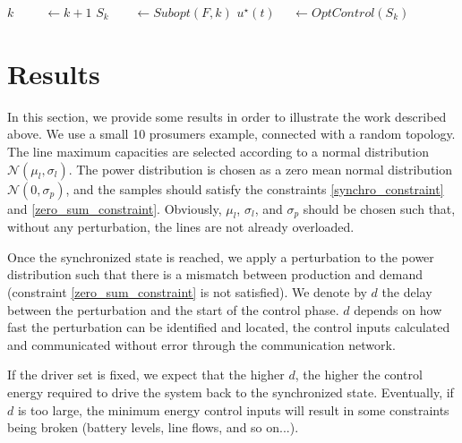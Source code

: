 \documentclass[10pt,twoside%
                ,draft%
        ]{article}
\begin{document}
\begin{algorithm}
\label{algo_1}
        \begin{algorithmic}
    \State $k\ \ \ \ \ \ \ \ \ \ \ \gets k+1$
    \State $ S_k \ \ \ \ \ \ \ \ \ \gets Subopt(F, k)$
    \State $ u^{\star}(t)\ \ \ \ \ \ \gets OptControl(S_{k})$ 

        \end{algorithmic}
\end{algorithm}
\normalsize



\section{Results}
In this section, we provide some results in order to illustrate the work described above. We use a small 10 prosumers example, connected with a random topology. The line maximum capacities are selected  according to a normal distribution $\mathcal{N}(\mu_l,\sigma_l)$.  The power distribution is chosen as a zero mean normal distribution $ \mathcal{N}(0,\sigma_p) $, and the samples should satisfy the constraints \ref{synchro_constraint} and \ref{zero_sum_constraint}. Obviously, $\mu_l$, $\sigma_l$, and $\sigma_p$ should be chosen such that, without any perturbation, the lines are not already overloaded.

Once the synchronized state is reached, we apply a perturbation to the power distribution such that there is a mismatch between production and demand (constraint \ref{zero_sum_constraint} is not satisfied). We denote by $d$ the delay between the perturbation and the start of the control phase. $d$ depends on how fast the perturbation can be identified and located, the control inputs calculated and communicated without error through the communication network.


 If the driver set is fixed, we expect that the higher $ d$, the higher the control energy required to drive the system back to the synchronized state. Eventually, if $d$ is too large, the minimum energy control inputs will result in some constraints being broken (battery levels, line flows, and so on...).
\end{document}
